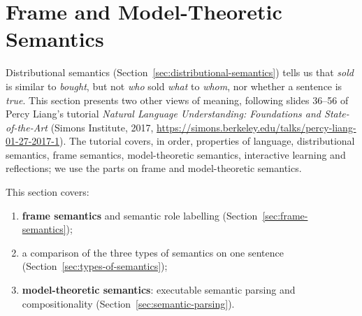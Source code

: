 \section{Frame and Model-Theoretic Semantics}
\label{sec:frame-model-semantics}

Distributional semantics (Section~\ref{sec:distributional-semantics}) tells us that
\emph{sold} is similar to \emph{bought}, but not \emph{who} sold \emph{what} to
\emph{whom}, nor whether a sentence is \emph{true}. This section presents two other views
of meaning, following slides 36--56 of Percy Liang's tutorial \emph{Natural Language
Understanding: Foundations and State-of-the-Art} (Simons Institute, 2017,
\url{https://simons.berkeley.edu/talks/percy-liang-01-27-2017-1}). The tutorial covers,
in order, properties of language, distributional semantics, frame semantics,
model-theoretic semantics, interactive learning and reflections; we use the parts on
frame and model-theoretic semantics.

This section covers:
\begin{enumerate}[nosep]
  \item \textbf{frame semantics} and semantic role labelling
        (Section~\ref{sec:frame-semantics});
  \item a comparison of the three types of semantics on one sentence
        (Section~\ref{sec:types-of-semantics});
  \item \textbf{model-theoretic semantics}: executable semantic parsing and
        compositionality (Section~\ref{sec:semantic-parsing}).
\end{enumerate}




